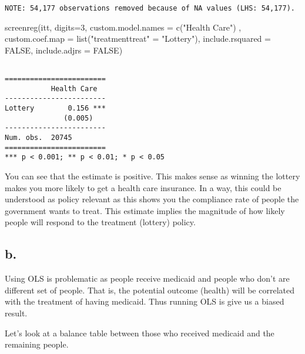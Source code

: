 \documentclass[
  letterpaper,
  DIV=11,
  numbers=noendperiod]{scrartcl}
\newenvironment{Shaded}{\begin{snugshade}}{\end{snugshade}}
\newcommand{\AttributeTok}[1]{\textcolor[rgb]{0.40,0.45,0.13}{#1}}
\newcommand{\ConstantTok}[1]{\textcolor[rgb]{0.56,0.35,0.01}{#1}}
\newcommand{\DecValTok}[1]{\textcolor[rgb]{0.68,0.00,0.00}{#1}}
\newcommand{\FunctionTok}[1]{\textcolor[rgb]{0.28,0.35,0.67}{#1}}
\newcommand{\NormalTok}[1]{\textcolor[rgb]{0.00,0.23,0.31}{#1}}
\newcommand{\OtherTok}[1]{\textcolor[rgb]{0.00,0.23,0.31}{#1}}
\newcommand{\StringTok}[1]{\textcolor[rgb]{0.13,0.47,0.30}{#1}}
\begin{document}
\begin{verbatim}
NOTE: 54,177 observations removed because of NA values (LHS: 54,177).
\end{verbatim}

\begin{Shaded}
\begin{Highlighting}[]
\FunctionTok{screenreg}\NormalTok{(itt, }\AttributeTok{digits=}\DecValTok{3}\NormalTok{, }\AttributeTok{custom.model.names =} \FunctionTok{c}\NormalTok{(}\StringTok{"Health Care"}\NormalTok{) , }\AttributeTok{custom.coef.map =} \FunctionTok{list}\NormalTok{(}\StringTok{"treatmenttreat"} \OtherTok{=} \StringTok{"Lottery"}\NormalTok{), }\AttributeTok{include.rsquared =} \ConstantTok{FALSE}\NormalTok{, }
       \AttributeTok{include.adjrs =} \ConstantTok{FALSE}\NormalTok{)}
\end{Highlighting}
\end{Shaded}

\begin{verbatim}

========================
           Health Care  
------------------------
Lottery        0.156 ***
              (0.005)   
------------------------
Num. obs.  20745        
========================
*** p < 0.001; ** p < 0.01; * p < 0.05
\end{verbatim}

You can see that the estimate is positive. This makes sense as winning
the lottery makes you more likely to get a health care insurance. In a
way, this could be understood as policy relevant as this shows you the
compliance rate of people the government wants to treat. This estimate
implies the magnitude of how likely people will respond to the treatment
(lottery) policy.

\subsection{b.}\label{b.-1}

Using OLS is problematic as people receive medicaid and people who don't
are different set of people. That is, the potential outcome (health)
will be correlated with the treatment of having medicaid. Thus running
OLS is give us a biased result.

Let's look at a balance table between those who received medicaid and
the remaining people.

\clearpage
\end{document}
